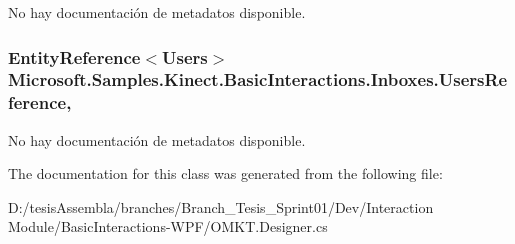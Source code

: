 No hay documentación de metadatos disponible. 

\hypertarget{class_microsoft_1_1_samples_1_1_kinect_1_1_basic_interactions_1_1_inboxes_ae687e52fcbefd39163128ea6e4977237}{
\subsubsection[{Users\-Reference}]{\setlength{\rightskip}{0pt plus 5cm}Entity\-Reference$<${\bf Users}$>$ Microsoft.\-Samples.\-Kinect.\-Basic\-Interactions.\-Inboxes.\-Users\-Reference\hspace{0.3cm}{\ttfamily [get]}, {\ttfamily [set]}}}\label{class_microsoft_1_1_samples_1_1_kinect_1_1_basic_interactions_1_1_inboxes_ae687e52fcbefd39163128ea6e4977237}


No hay documentación de metadatos disponible. 



The documentation for this class was generated from the following file\-:\begin{DoxyCompactItemize}
\item 
D\-:/tesis\-Assembla/branches/\-Branch\-\_\-\-Tesis\-\_\-\-Sprint01/\-Dev/\-Interaction Module/\-Basic\-Interactions-\/\-W\-P\-F/O\-M\-K\-T.\-Designer.\-cs\end{DoxyCompactItemize}
